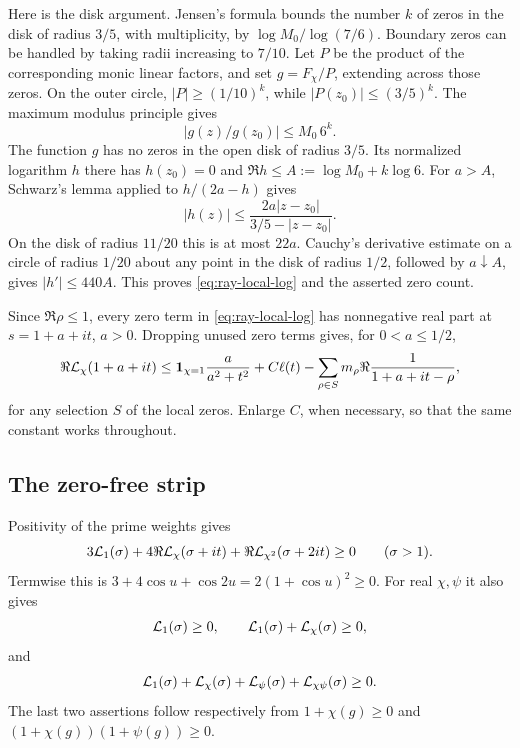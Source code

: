 Here is the disk argument. Jensen's formula bounds the number \(k\)
of zeros in the disk of radius \(3/5\), with multiplicity, by
\(\log M_0/\log(7/6)\).
Boundary zeros can be handled by taking radii increasing to \(7/10\).
Let \(P\) be the product of the corresponding monic linear factors,
and set \(g=F_\chi/P\), extending across those zeros.
On the outer circle, \(|P|\geq(1/10)^k\), while
\(|P(z_0)|\leq(3/5)^k\). The maximum modulus principle gives
\[
                  |g(z)/g(z_0)|\leq M_0\,6^k .
\]
The function \(g\) has no zeros in the open disk of radius \(3/5\).
Its normalized logarithm \(h\) there has \(h(z_0)=0\) and
\(\Re h\leq A:=\log M_0+k\log6\).
For \(a>A\), Schwarz's lemma applied to \(h/(2a-h)\) gives
\[
                  |h(z)|\leq\frac{2a|z-z_0|}{3/5-|z-z_0|}.
\]
On the disk of radius \(11/20\) this is at most \(22a\).
Cauchy's derivative estimate on a circle of radius \(1/20\)
about any point in the disk of radius \(1/2\), followed by
\(a\downarrow A\), gives \(|h'|\leq440A\).
This proves \eqref{eq:ray-local-log} and the asserted zero count.

Since \(\Re\rho\leq1\), every zero term in
\eqref{eq:ray-local-log} has nonnegative real part at
\(s=1+a+it\), \(a>0\). Dropping unused zero terms gives, for
\(0<a\leq1/2\),
\begin{equation}
 \label{eq:ray-real-log-upper}
 \Re{\cal L}_\chi(1+a+it)
 \leq{\bf1}_{\chi=1}\frac{a}{a^2+t^2}
       +C\ell(t)-\sum_{\rho\in S}
                m_\rho\Re\frac1{1+a+it-\rho},
\end{equation}
for any selection \(S\) of the local zeros. Enlarge \(C\), when
necessary, so that the same constant works throughout.

\subsection{The zero-free strip}

Positivity of the prime weights gives
\begin{equation}
 \label{eq:ray-341}
 3{\cal L}_1(\sigma)+4\Re{\cal L}_\chi(\sigma+it)
                        +\Re{\cal L}_{\chi^2}(\sigma+2it)\geq0
                        \qquad(\sigma>1).
\end{equation}
Termwise this is \(3+4\cos u+\cos2u=2(1+\cos u)^2\geq0\).
For real \(\chi,\psi\) it also gives
\[
 {\cal L}_1(\sigma)\geq0,\qquad
 {\cal L}_1(\sigma)+{\cal L}_\chi(\sigma)\geq0,
\]
and
\[
 {\cal L}_1(\sigma)+{\cal L}_\chi(\sigma)
       +{\cal L}_\psi(\sigma)+{\cal L}_{\chi\psi}(\sigma)\geq0.
\]
The last two assertions follow respectively from \(1+\chi(g)\geq0\)
and \((1+\chi(g))(1+\psi(g))\geq0\).

